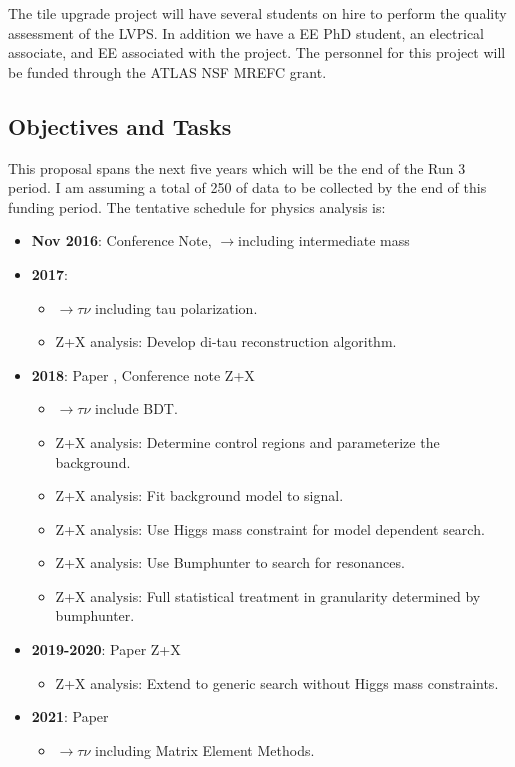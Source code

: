 \documentclass[11pt]{article}
\newcommand{\too}{$\rightarrow$}
\begin{document}
The tile upgrade project will have several students on hire to perform the quality assessment of the LVPS.  In addition we have a EE PhD student, an electrical associate, and EE associated with the project.  
The personnel for this project will be funded through the ATLAS NSF MREFC grant. 

\subsection{Objectives and Tasks}
\label{sec:time}
This proposal spans the next five years which will be the end of the Run 3 period.  I am assuming a total of 250 \invfb of data to be collected by the end of this funding period.  
The tentative schedule for physics analysis is:
\begin{itemize}
\item{\textbf{Nov 2016}}: Conference Note, \Hp \too including intermediate mass
\item{\textbf{2017}}: 
\begin{itemize}
\item{\Hp \too $\tau \nu$ including tau polarization.}
\item{Z+X analysis: Develop di-tau reconstruction algorithm.}
\end{itemize}
\item{\textbf{2018}}: Paper \Hp, Conference note Z+X
\begin{itemize}
\item{\Hp \too $\tau \nu$ include BDT.}
\item{Z+X analysis: Determine control regions and parameterize the background.}
\item{Z+X analysis: Fit background model to signal.}
\item{Z+X analysis: Use Higgs mass constraint for model dependent search.}
\item{Z+X analysis: Use Bumphunter to search for resonances.}
\item{Z+X analysis: Full statistical treatment in granularity determined by bumphunter.}
\end{itemize}
\item{\textbf{2019-2020}}: Paper Z+X
\begin{itemize}
\item{Z+X analysis: Extend to generic search without Higgs mass constraints.}
\end{itemize}
\item{\textbf{2021}}: Paper \Hp
\begin{itemize}
\item{\Hp \too $\tau \nu$ including Matrix Element Methods.}



\end{itemize}
\end{itemize}
\end{document}
